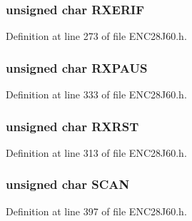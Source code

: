 \hypertarget{union___r_e_g_a75125d823ccf82a8c72aefd5deeadaa3}{}
\subsubsection[{R\+X\+E\+R\+I\+F}]{\setlength{\rightskip}{0pt plus 5cm}unsigned {\bf char} R\+X\+E\+R\+I\+F}\label{union___r_e_g_a75125d823ccf82a8c72aefd5deeadaa3}


Definition at line 273 of file E\+N\+C28\+J60.\+h.

\hypertarget{union___r_e_g_afc0d91f763eacf0053b89ae716a9292d}{}
\subsubsection[{R\+X\+P\+A\+U\+S}]{\setlength{\rightskip}{0pt plus 5cm}unsigned {\bf char} R\+X\+P\+A\+U\+S}\label{union___r_e_g_afc0d91f763eacf0053b89ae716a9292d}


Definition at line 333 of file E\+N\+C28\+J60.\+h.

\hypertarget{union___r_e_g_aeda782c968f54ee5c657f82d117e33c6}{}
\subsubsection[{R\+X\+R\+S\+T}]{\setlength{\rightskip}{0pt plus 5cm}unsigned {\bf char} R\+X\+R\+S\+T}\label{union___r_e_g_aeda782c968f54ee5c657f82d117e33c6}


Definition at line 313 of file E\+N\+C28\+J60.\+h.

\hypertarget{union___r_e_g_a71efc180ae95c51db6cd9e90d14d0a06}{}
\subsubsection[{S\+C\+A\+N}]{\setlength{\rightskip}{0pt plus 5cm}unsigned {\bf char} S\+C\+A\+N}\label{union___r_e_g_a71efc180ae95c51db6cd9e90d14d0a06}


Definition at line 397 of file E\+N\+C28\+J60.\+h.

